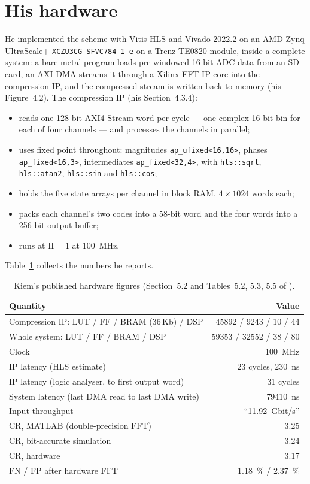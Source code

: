 \section{His hardware}
\label{sec:kiem_hw}

He implemented the scheme with Vitis HLS and Vivado 2022.2 on an AMD Zynq
UltraScale+ \texttt{XCZU3CG-SFVC784-1-e} on a Trenz TE0820 module, inside a
complete system: a bare-metal program loads pre-windowed 16-bit ADC data from
an SD card, an AXI DMA streams it through a Xilinx FFT IP core into the
compression IP, and the compressed stream is written back to memory
(his Figure~4.2). The compression IP (his Section~4.3.4):

\begin{itemize}
\item reads one 128-bit AXI4-Stream word per cycle --- one complex 16-bit bin
for each of four channels --- and processes the channels in parallel;
\item uses fixed point throughout: magnitudes \texttt{ap\_ufixed<16,16>},
phases \texttt{ap\_fixed<16,3>}, intermediates \texttt{ap\_fixed<32,4>}, with
\texttt{hls::sqrt}, \texttt{hls::atan2}, \texttt{hls::sin} and
\texttt{hls::cos};
\item holds the five state arrays per channel in block RAM, $4 \times 1024$
words each;
\item packs each channel's two codes into a 58-bit word and the four words into
a 256-bit output buffer;
\item runs at $\mathrm{II} = 1$ at \SI{100}{\mega\hertz}.
\end{itemize}

\noindent
Table~\ref{tab:kiem_hwres} collects the numbers he reports.

\begin{table}[htbp]
\centering
\caption[Kiem's hardware results]{Kiem's published hardware figures
(Section~5.2 and Tables~5.2, 5.3, 5.5 of \cite{kiem2025}).}
\label{tab:kiem_hwres}
\small
\begin{tabular}{@{}lr@{}}
\toprule
Quantity & Value\\
\midrule
Compression IP: LUT / FF / BRAM (36\,Kb) / DSP & \num{45892} / \num{9243} / 10 / 44\\
Whole system: LUT / FF / BRAM / DSP & \num{59353} / \num{32552} / 38 / 80\\
Clock & \SI{100}{\mega\hertz}\\
IP latency (HLS estimate) & 23 cycles, \SI{230}{\nano\second}\\
IP latency (logic analyser, to first output word) & 31 cycles\\
System latency (last DMA read to last DMA write) & \SI{79410}{\nano\second}\\
Input throughput & ``\SI{11.92}{Gbit/s}''\\
CR, MATLAB (double-precision FFT) & 3.25\\
CR, bit-accurate simulation & 3.24\\
CR, hardware & 3.17\\
FN / FP after hardware FFT & \SI{1.18}{\percent} / \SI{2.37}{\percent}\\
\bottomrule
\end{tabular}
\end{table}

